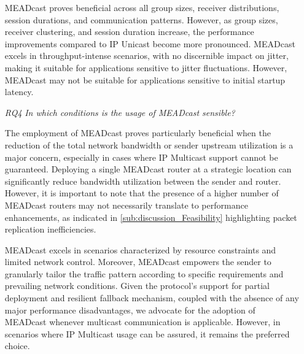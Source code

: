 \begin{itemize}
    MEADcast proves beneficial across all group sizes, receiver distributions,
        session durations, and communication patterns.
    However, as group sizes, receiver clustering, and session duration
        increase, the performance improvements compared to IP Unicast become
        more pronounced.
    MEADcast excels in throughput-intense scenarios, with no discernible impact
        on jitter, making it suitable for applications sensitive to jitter
        fluctuations.
    However, MEADcast may not be suitable for applications sensitive to initial
        startup latency.

\item[\textit{RQ4}]
    \textit{In which conditions is the usage of MEADcast sensible?}

    The employment of MEADcast proves particularly beneficial when the
        reduction of the total network bandwidth or sender upstream utilization
        is a major concern, especially in cases where IP Multicast support
        cannot be guaranteed.
    Deploying a single MEADcast router at a strategic location can
        significantly reduce bandwidth utilization between the sender and
        router.
    However, it is important to note that the presence of a higher number of
        MEADcast routers may not necessarily translate to performance
        enhancements, as indicated in \autoref{sub:discussion_Feasibility}
        highlighting packet replication inefficiencies.

    MEADcast excels in scenarios characterized by resource constraints and
        limited network control.
    Moreover, MEADcast empowers the sender to granularly tailor the traffic
        pattern according to specific requirements and prevailing network
        conditions.
    Given the protocol's support for partial deployment and resilient fallback
        mechanism, coupled with the absence of any major performance
        disadvantages, we advocate for the adoption of MEADcast whenever
        multicast communication is applicable.
    However, in scenarios where IP Multicast usage can be assured, it remains
        the preferred choice.

\end{itemize}

